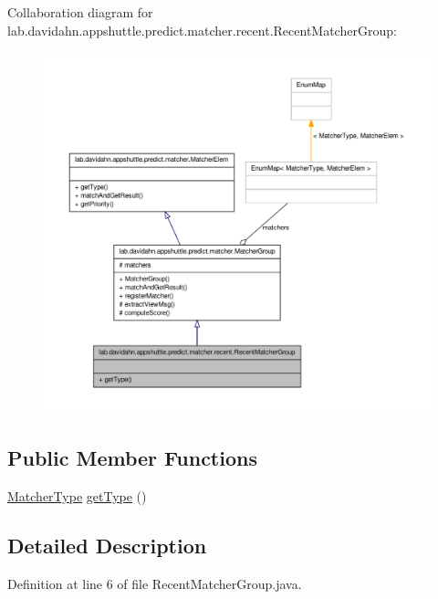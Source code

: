 \-Collaboration diagram for lab.\-davidahn.\-appshuttle.\-predict.\-matcher.\-recent.\-Recent\-Matcher\-Group\-:
\nopagebreak
\begin{figure}[H]
\begin{center}
\leavevmode
\includegraphics[width=350pt]{classlab_1_1davidahn_1_1appshuttle_1_1predict_1_1matcher_1_1recent_1_1_recent_matcher_group__coll__graph}
\end{center}
\end{figure}
\subsection*{\-Public \-Member \-Functions}
\begin{DoxyCompactItemize}
\item 
\hyperlink{enumlab_1_1davidahn_1_1appshuttle_1_1predict_1_1matcher_1_1_matcher_type}{\-Matcher\-Type} \hyperlink{classlab_1_1davidahn_1_1appshuttle_1_1predict_1_1matcher_1_1recent_1_1_recent_matcher_group_a837fbdb964535c1678f83b948601a0d9}{get\-Type} ()
\end{DoxyCompactItemize}


\subsection{\-Detailed \-Description}


\-Definition at line 6 of file \-Recent\-Matcher\-Group.\-java.



